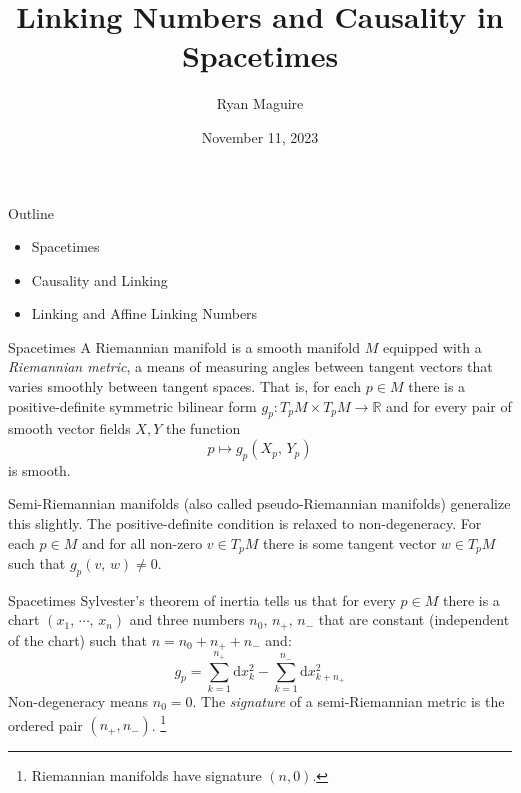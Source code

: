 \documentclass{beamer}
\title{Linking Numbers and Causality in Spacetimes}
\author{Ryan Maguire}
\date{November 11, 2023}
\begin{document}
    \maketitle
    \begin{frame}{Outline}
        \begin{itemize}
            \item Spacetimes
            \item Causality and Linking
            \item Linking and Affine Linking Numbers
        \end{itemize}
    \end{frame}
    \begin{frame}{Spacetimes}
        A Riemannian manifold is a smooth manifold $M$ equipped with a
        \textit{Riemannian metric}, a means of measuring angles between
        tangent vectors that varies smoothly between tangent spaces. That is,
        for each $p\in{M}$ there is a positive-definite symmetric bilinear form
        $g_{p}:T_{p}M\times{T}_{p}M\rightarrow\mathbb{R}$ and for every pair of
        smooth vector fields $X,Y$ the function
        \begin{equation}
            p\mapsto{g}_{p}(X_{p},\,Y_{p})
        \end{equation}
        is smooth.
        \par\hfill\par
        Semi-Riemannian manifolds (also called pseudo-Riemannian manifolds)
        generalize this slightly. The positive-definite condition is relaxed to
        non-degeneracy. For each $p\in{M}$ and for all non-zero $v\in{T}_{p}M$
        there is some tangent vector $w\in{T}_{p}M$ such that
        $g_{p}(v,\,w)\ne{0}$.
    \end{frame}
    \begin{frame}{Spacetimes}
        Sylvester's theorem of inertia tells us that for every $p\in{M}$
        there is a chart $(x_{1},\,\cdots,\,x_{n})$ and three numbers
        $n_{0},\,n_{+},\,n_{-}$ that are constant (independent of the chart)
        such that $n=n_{0}+n_{+}+n_{-}$ and:
        \begin{equation}
            g_{p}=\sum_{k=1}^{n_{+}}\textrm{d}x_{k}^{2}
                -\sum_{k=1}^{n_{-}}\textrm{d}x_{k+n_{+}}^{2}
        \end{equation}
        Non-degeneracy means $n_{0}=0$. The \textit{signature} of a
        semi-Riemannian metric is the ordered pair $(n_{+},n_{-})$.%
        \footnote{%
            Riemannian manifolds have signature $(n,0)$.
        }
    \end{frame}
\end{document}
